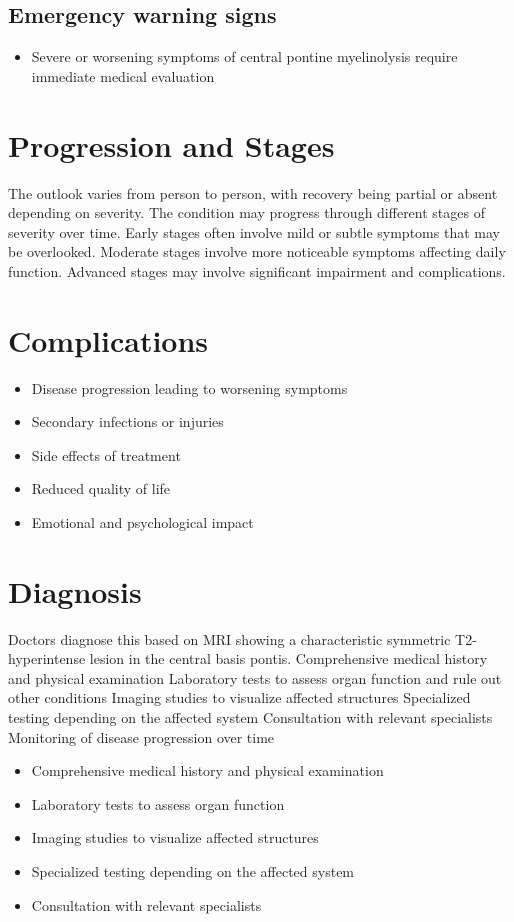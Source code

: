 \subsection{Emergency warning signs}
\begin{itemize}[noitemsep]
  \item Severe or worsening symptoms of central pontine myelinolysis require immediate medical evaluation
\end{itemize}
\section{Progression and Stages}
The outlook varies from person to person, with recovery being partial or absent depending on severity. The condition may progress through different stages of severity over time. Early stages often involve mild or subtle symptoms that may be overlooked. Moderate stages involve more noticeable symptoms affecting daily function. Advanced stages may involve significant impairment and complications.
\section{Complications}
\begin{itemize}[noitemsep]
  \item Disease progression leading to worsening symptoms
  \item Secondary infections or injuries
  \item Side effects of treatment
  \item Reduced quality of life
  \item Emotional and psychological impact
\end{itemize}
\section{Diagnosis}
Doctors diagnose this based on MRI showing a characteristic symmetric T2-hyperintense lesion in the central basis pontis. Comprehensive medical history and physical examination Laboratory tests to assess organ function and rule out other conditions Imaging studies to visualize affected structures Specialized testing depending on the affected system Consultation with relevant specialists Monitoring of disease progression over time

\begin{itemize}[noitemsep]
  \item Comprehensive medical history and physical examination
  \item Laboratory tests to assess organ function
  \item Imaging studies to visualize affected structures
  \item Specialized testing depending on the affected system
  \item Consultation with relevant specialists
\end{itemize}
